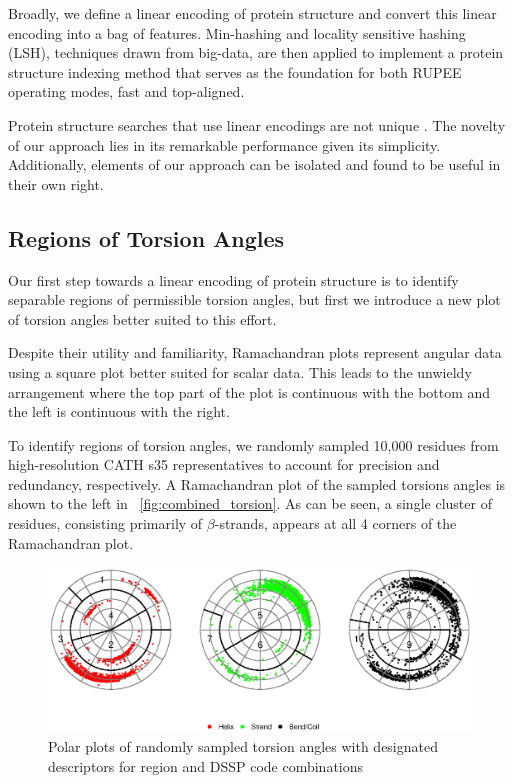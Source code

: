 \documentclass[letter,center,fleqn]{NAR}
\begin{document}
Broadly, we define a linear encoding of protein structure and convert this linear encoding into a bag of features. 
Min-hashing and locality sensitive hashing (LSH), techniques drawn from big-data, are then applied to implement a protein structure indexing method that serves as the foundation for both RUPEE operating modes, fast and top-aligned. 

Protein structure searches that use linear encodings are not unique \cite{Carpentier2005,Daniluk2011,Ritchie2012}.
The novelty of our approach lies in its remarkable performance given its simplicity. 
Additionally, elements of our approach can be isolated and found to be useful in their own right. 

\subsection{Regions of Torsion Angles}

Our first step towards a linear encoding of protein structure is to identify separable regions of permissible torsion angles,
but first we introduce a new plot of torsion angles better suited to this effort. 

Despite their utility and familiarity, Ramachandran plots \cite{Ramachandran1968} represent angular data using a square plot better suited for scalar data.
This leads to the unwieldy arrangement where the top part of the plot is continuous with the bottom and the left is continuous with the right. 

To identify regions of torsion angles, we randomly sampled 10,000 residues from high-resolution CATH s35 representatives to account for precision and redundancy, respectively. 
A Ramachandran plot of the sampled torsions angles is shown to the left in \figurename~\ref{fig:combined_torsion}. 
As can be seen, a single cluster of residues, consisting primarily of $\beta$-strands, appears at all 4 corners of the Ramachandran plot.

\begin{figure}[tb]
\begin{center}
\includegraphics{regions}
\end{center}
\caption{Polar plots of randomly sampled torsion angles with designated descriptors for region and DSSP code combinations}
\label{fig:regions}
\end{figure}
\end{document}
